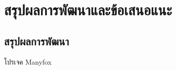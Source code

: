 \chapter{สรุปผลการพัฒนาและข้อเสนอแนะ}
\label{chapter:conclusion}
\section{สรุปผลการพัฒนา}
 โปรเจค Manyfox 